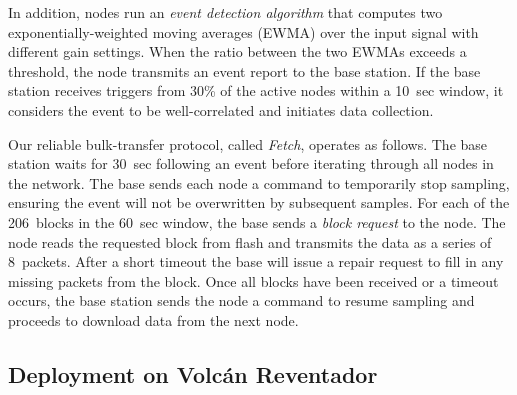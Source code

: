 In addition, nodes run an {\em event detection algorithm} that
computes two exponentially-weighted moving averages (EWMA) 
over the input signal with different gain
settings. When the ratio between the two EWMAs exceeds a threshold,
the node transmits an event report to the base station.
If the base station receives triggers from 30\% of the active nodes
within a 10~sec window, it considers the event to be well-correlated 
and initiates data collection.

Our reliable bulk-transfer protocol, called {\em Fetch}, operates
as follows. The base station waits for 30~sec following an event
before iterating through all nodes in the network. The base sends each
node a command to temporarily stop sampling, ensuring the event
will not be overwritten by subsequent samples. 
For each of the 206~blocks in the 60~sec window, 
the base sends a {\em block request} to the node.
The node reads the requested block from flash and 
transmits the data as a series of 8~packets. 
After a short timeout the base will issue
a repair request to fill in any missing packets from the block.
Once all blocks have been received or a timeout occurs, the base 
station sends the node a command to resume sampling and proceeds 
to download data from the next node. 

\subsection{Deployment on Volc\'{a}n Reventador}

